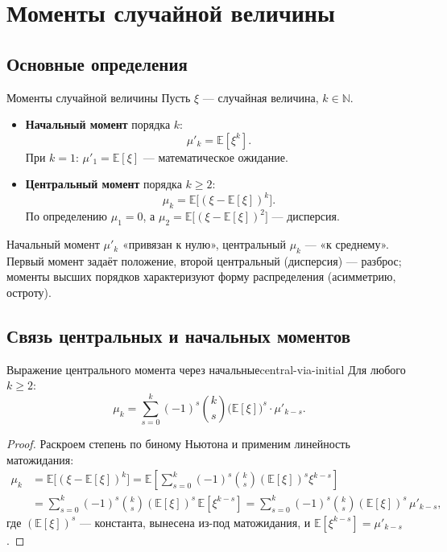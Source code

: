 
\section{Моменты случайной величины}


\subsection{Основные определения}

\begin{Definition}{Моменты случайной величины}{}
	Пусть $\xi$ — случайная величина, $k\in\mathbb N$.
	\begin{itemize}
		\item \textbf{Начальный момент} порядка $k$:
		\[
		\mu'_k=\mathbb{E}[\xi^k].
		\]
		При $k=1$: $\mu'_1=\mathbb{E}[\xi]$ — математическое ожидание.
		\item \textbf{Центральный момент} порядка $k\ge 2$:
		\[
		\mu_k=\mathbb{E}\bigl[(\xi-\mathbb{E}[\xi])^k\bigr].
		\]
		По определению $\mu_1=0$, а $\mu_2=\mathbb{E}\bigl[(\xi-\mathbb{E}[\xi])^2\bigr]$ — дисперсия.
	\end{itemize}
\end{Definition}

\begin{Remark}{}{}
	Начальный момент $\mu'_k$ «привязан к нулю», центральный $\mu_k$ — «к среднему». Первый момент задаёт положение, второй центральный (дисперсия) — разброс; моменты высших порядков характеризуют форму распределения (асимметрию, остроту).
\end{Remark}

\subsection{Связь центральных и начальных моментов}

\begin{Theorem}{Выражение центрального момента через начальные}{central-via-initial}
	Для любого $k\ge 2$:
	\[
	\mu_k=\sum_{s=0}^{k}(-1)^s\binom{k}{s}\bigl(\mathbb{E}[\xi]\bigr)^s\cdot\mu'_{k-s}.
	\]
\end{Theorem}

\begin{proof}
	Раскроем степень по биному Ньютона и применим линейность матожидания:
	\begin{align*}
		\mu_k
		&=\mathbb{E}\bigl[(\xi-\mathbb{E}[\xi])^k\bigr]
		=\mathbb{E}\!\left[\sum_{s=0}^{k}(-1)^s\binom{k}{s}(\mathbb{E}[\xi])^s\xi^{k-s}\right]\\
		&=\sum_{s=0}^{k}(-1)^s\binom{k}{s}(\mathbb{E}[\xi])^s\,\mathbb{E}[\xi^{k-s}]
		=\sum_{s=0}^{k}(-1)^s\binom{k}{s}(\mathbb{E}[\xi])^s\,\mu'_{k-s},
	\end{align*}
	где $(\mathbb{E}[\xi])^s$ — константа, вынесена из-под матожидания, и $\mathbb{E}[\xi^{k-s}]=\mu'_{k-s}$.
\end{proof}

